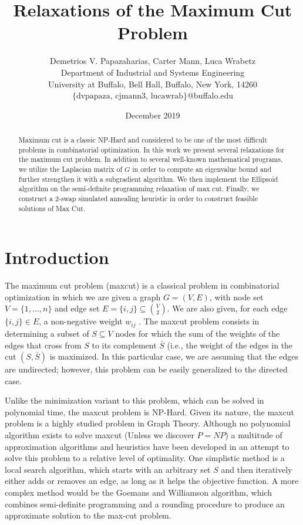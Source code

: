 \documentclass[12pt]{article}
\title{Relaxations of the Maximum Cut Problem}
\author{Demetrios V. Papazaharias, Carter Mann, Luca Wrabetz\\ \small Department of Industrial and Systems Engineering \\
\small University at Buffalo, Bell Hall, Buffalo, New York, 14260\\\small $\lbrace \text{dvpapaza, cjmann3, lucawrab}\rbrace$@buffalo.edu}
\date{December 2019}
\theoremstyle{plain}
\theoremstyle{definition}
\begin{document}
\maketitle
\begin{abstract}
    Maximum cut is a classic NP-Hard and considered to be one of the most difficult problems in combinatorial optimization. In this work we present several relaxations for the maximum cut problem. In addition to several well-known mathematical programs, we utilize the Laplacian matrix of $G$ in order to compute an eigenvalue bound and further strengthen it with a subgradient algorithm. We then implement the Ellipsoid algorithm on the semi-definite programming relaxation of max cut. Finally, we construct a 2-swap simulated annealing heuristic in order to construct feasible solutions of Max Cut.
\end{abstract}

\clearpage
\section{Introduction}\label{sec:Introduction}
The maximum cut problem (maxcut) is a classical problem in combinatorial optimization in which we are given a graph $G = (V, E)$, with node set $V = \lbrace 1,...,n \rbrace$ and edge set $E = \lbrace i, j \rbrace \subseteq \binom{V}{2}$. We are also given, for each edge $\{i, j\} \in E$, a non-negative weight $w_{ij}$ . The maxcut problem consists in determining a subset of $S \subseteq V$ nodes for which the sum of the weights of the edges that cross from $S$ to its complement $\bar{S}$ (i.e., the weight of the edges in the cut $(S, \bar{S})$ is maximized. In this particular case, we are assuming that the edges are undirected; however, this problem can be easily generalized to the directed case.

Unlike the minimization variant to this problem, which can be solved in polynomial time, the maxcut problem is NP-Hard. Given its nature, the maxcut problem is a highly studied problem in Graph Theory. Although no polynomial algorithm exists to solve maxcut (Unless we discover $P = NP$) a multitude of approximation algorithms and heuristics have been developed in an attempt to solve this problem to a relative level of optimality. One simplistic method is a local search algorithm, which starts with an arbitrary set $S$ and then iteratively either adds or removes an edge, as long as it helps the objective function. A more complex method would be the Goemans and Williamson algorithm, which  combines semi-definite programming and a rounding procedure to produce an approximate solution to the max-cut problem.
\end{document}
